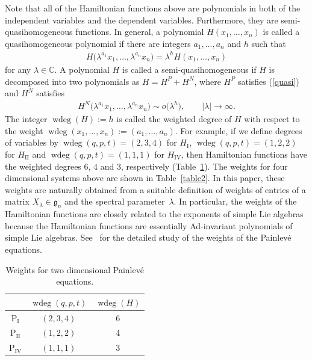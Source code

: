 \documentclass[pdftex]{sigma}
\numberwithin{equation}{section}
\begin{document}
Note that all of the Hamiltonian functions above are polynomials in both of the independent variables and the dependent variables. Furthermore, they are semi-quasihomogeneous functions. In general, a polynomial $H(x_1, \dots ,x_n)$ is called a quasihomogeneous polynomial if there are integers $a_1, \dots ,a_n$ and $h$ such that
\begin{gather}
H\big(\lambda ^{a_1}x_1 , \dots ,\lambda ^{a_n}x_n\big) = \lambda ^h H(x_1, \dots ,x_n)\label{quasi}
\end{gather}
for any $\lambda \in \mathbb{C}$. A polynomial $H$ is called a semi-quasihomogeneous if $H$ is decomposed into two polynomials as $H = H^P + H^N$, where $H^P$ satisf\/ies (\ref{quasi}) and $H^N$ satisf\/ies
\begin{gather*}
H^N\big(\lambda ^{a_1}x_1 , \dots ,\lambda ^{a_n}x_n\big) \sim o\big(\lambda ^h\big), \qquad |\lambda | \to \infty.
\end{gather*}
The integer $\operatorname{wdeg}(H) := h$ is called the weighted degree of $H$ with respect to the weight $\operatorname{wdeg}(x_1, \dots ,x_n) := (a_1 ,\dots ,a_n)$. For example, if we def\/ine degrees of variables by $\operatorname{wdeg} (q,p,t) = (2,3,4)$ for $H_{\text{I}}$, $\operatorname{wdeg} (q,p,t) = (1,2,2)$ for $H_{\text{II}}$ and $\operatorname{wdeg} (q,p,t) = (1,1,1)$ for $H_{\text{IV}}$, then Hamiltonian functions have the weighted degrees $6$, $4$ and $3$, respectively (Table~\ref{table1}). The weights for four dimensional systems above are shown in Table~\ref{table2}. In this paper, these weights are naturally obtained from a suitable def\/inition of weights of entries of a matrix $X_\lambda \in \mathfrak{g}_n$ and the spectral parameter~$\lambda $. In particular, the weights of the Hamiltonian functions are closely related to the exponents of simple Lie algebras because the Hamiltonian functions are essentially Ad-invariant polynomials of simple Lie algebras. See~\cite{Chi1, Chi2, Chi3} for the detailed study of the weights of the Painlev\'{e} equations.

\begin{table}[h]\centering\caption{Weights for two dimensional Painlev\'{e} equations.}\label{table1}\vspace{1mm}
\begin{tabular}{|c||c|c|}
\hline
 & $\operatorname{wdeg}(q,p,t)$ & $\operatorname{wdeg} (H)$ \\ \hline \hline
$\text{P}_\text{I}$ & $(2,3,4)$ & 6 \\ \hline
$\text{P}_\text{II}$ & $(1,2,2)$ & 4 \\ \hline
$\text{P}_\text{IV}$ & $(1,1,1)$ & 3 \\ \hline
\end{tabular}
\end{table}
\end{document}
